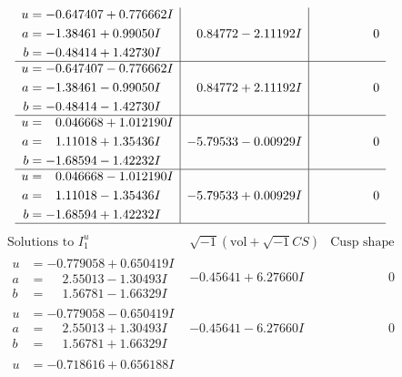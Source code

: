 \documentclass[1p]{elsarticle_modified}
\theoremstyle{definition}
\newcommand{\I}{\sqrt{-1}}
\begin{document}
$$\begin{array}{c|c|c}
\begin{aligned}
u &= -0.647407 + 0.776662 I \\
a &= -1.38461 + 0.99050 I \\
b &= -0.48414 + 1.42730 I\end{aligned}
 & \phantom{-}0.84772 - 2.11192 I & \phantom{-0.000000 } 0 \\ \hline\begin{aligned}
u &= -0.647407 - 0.776662 I \\
a &= -1.38461 - 0.99050 I \\
b &= -0.48414 - 1.42730 I\end{aligned}
 & \phantom{-}0.84772 + 2.11192 I & \phantom{-0.000000 } 0 \\ \hline\begin{aligned}
u &= \phantom{-}0.046668 + 1.012190 I \\
a &= \phantom{-}1.11018 + 1.35436 I \\
b &= -1.68594 - 1.42232 I\end{aligned}
 & -5.79533 - 0.00929 I & \phantom{-0.000000 } 0 \\ \hline\begin{aligned}
u &= \phantom{-}0.046668 - 1.012190 I \\
a &= \phantom{-}1.11018 - 1.35436 I \\
b &= -1.68594 + 1.42232 I\end{aligned}
 & -5.79533 + 0.00929 I & \phantom{-0.000000 } 0\\
 \hline 
 \end{array}$$\newpage$$\begin{array}{c|c|c}  
\text{Solutions to }I^u_{1}& \I (\text{vol} + \sqrt{-1}CS) & \text{Cusp shape}\\
 \hline 
\begin{aligned}
u &= -0.779058 + 0.650419 I \\
a &= \phantom{-}2.55013 - 1.30493 I \\
b &= \phantom{-}1.56781 - 1.66329 I\end{aligned}
 & -0.45641 + 6.27660 I & \phantom{-0.000000 } 0 \\ \hline\begin{aligned}
u &= -0.779058 - 0.650419 I \\
a &= \phantom{-}2.55013 + 1.30493 I \\
b &= \phantom{-}1.56781 + 1.66329 I\end{aligned}
 & -0.45641 - 6.27660 I & \phantom{-0.000000 } 0 \\ \hline\begin{aligned}
u &= -0.718616 + 0.656188 I \\

\end{aligned}
\end{array}$$
\end{document}
